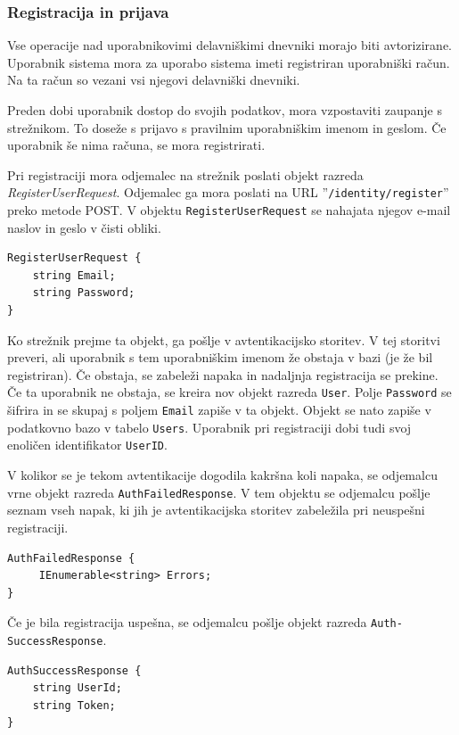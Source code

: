 \documentclass[a4paper, 12pt]{book}
\begin{document}
\subsubsection{Registracija in prijava}

Vse operacije nad uporabnikovimi delavniškimi dnevniki morajo biti avtorizirane.
Uporabnik sistema mora za uporabo sistema imeti registriran uporabniški račun.
Na ta račun so vezani vsi njegovi delavniški dnevniki.

Preden dobi uporabnik dostop do svojih podatkov, mora vzpostaviti zaupanje s strežnikom.
To doseže s prijavo s pravilnim uporabniškim imenom in geslom.
Če uporabnik še nima računa, se mora registrirati.

Pri registraciji mora odjemalec na strežnik poslati objekt razreda \textit{RegisterUserRequest}.
Odjemalec ga mora poslati na URL ''\texttt{/identity/register}'' preko metode POST.
V objektu \texttt{RegisterUserRequest} se nahajata njegov e-mail naslov in geslo v čisti obliki.

\begin{verbatim}
RegisterUserRequest {
    string Email; 
    string Password; 
} 
\end{verbatim}


Ko strežnik prejme ta objekt, ga pošlje v avtentikacijsko storitev.
V tej storitvi preveri, ali uporabnik s tem uporabniškim imenom že obstaja v bazi (je že bil registriran).
Če obstaja, se zabeleži napaka in nadaljnja registracija se prekine.
Če ta uporabnik ne obstaja, se kreira nov objekt razreda \texttt{User}.
Polje \texttt{Password} se šifrira in se skupaj s poljem \texttt{Email} zapiše v ta objekt.
Objekt se nato zapiše v podatkovno bazo v tabelo \texttt{Users}.
Uporabnik pri registraciji dobi tudi svoj enoličen identifikator \texttt{UserID}.

V kolikor se je tekom avtentikacije dogodila kakršna koli napaka, se odjemalcu vrne objekt razreda \texttt{AuthFailedResponse}.
V tem objektu se odjemalcu pošlje seznam vseh napak, ki jih je avtentikacijska storitev zabeležila pri neuspešni registraciji. 

\begin{verbatim}
AuthFailedResponse { 
     IEnumerable<string> Errors; 
}
\end{verbatim}


Če je bila registracija uspešna, se odjemalcu pošlje objekt razreda \texttt{Auth-\\SuccessResponse}.

\begin{verbatim}
AuthSuccessResponse { 
    string UserId; 
    string Token; 
} 
\end{verbatim}
\end{document}
